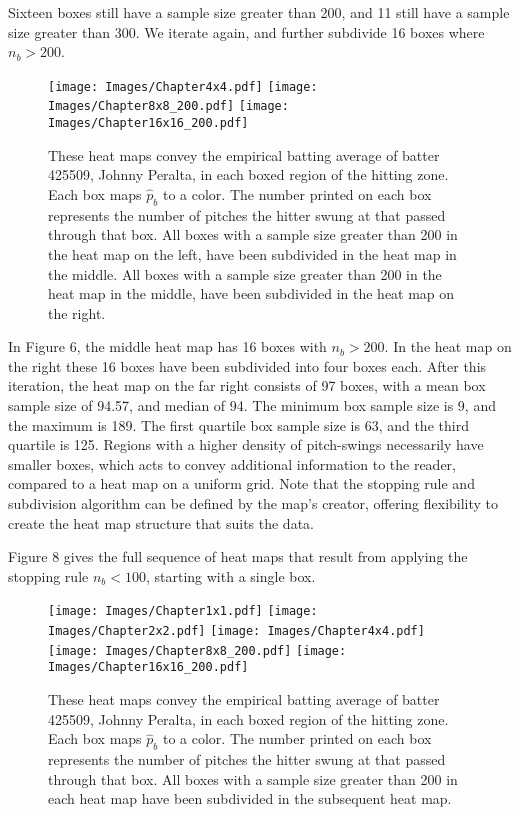 Sixteen boxes still have a sample size greater than 200, and 11 still have a sample size greater than 300. We iterate again, and further subdivide 16 boxes where $n_{b} > 200$.
        \begin{figure}[H]
      	\centering
      	
      	\texttt{[image: Images/Chapter4x4.pdf]}
      	\texttt{[image: Images/Chapter8x8\_200.pdf]} 
      	\texttt{[image: Images/Chapter16x16\_200.pdf]} 
      	\caption{These heat maps convey the empirical batting average of batter 425509, Johnny Peralta, in each boxed region of the hitting zone. Each box maps $\hat{p}_{b}$ to a color. The number printed on each box represents the number of pitches the hitter swung at that passed through that box. All boxes with a sample size greater than 200 in the heat map on the left, have been subdivided in the heat map in the middle. All boxes with a sample size greater than 200 in the heat map in the middle, have been subdivided in the heat map on the right.}
      	\end{figure}
In Figure 6, the middle heat map has 16 boxes with $n_{b} > 200$. In the heat map on the right these 16 boxes have been subdivided into four boxes each. After this iteration, the heat map on the far right consists of 97 boxes, with a mean box sample size of 94.57, and median of 94. The minimum box sample size is 9, and the maximum is 189. The first quartile box sample size is 63, and the third quartile is 125. Regions with a higher density of pitch-swings necessarily have smaller boxes, which acts to convey additional information to the reader, compared to a heat map on a uniform grid. Note that the stopping rule and subdivision algorithm can be defined by the map's creator, offering flexibility to create the heat map structure that suits the data. 

Figure 8 gives the full sequence of heat maps that result from applying the stopping rule $n_{b} < 100$, starting with a single box.
        \begin{figure}[H]
      	\centering
      	\texttt{[image: Images/Chapter1x1.pdf]}
      	\texttt{[image: Images/Chapter2x2.pdf]}
      	\texttt{[image: Images/Chapter4x4.pdf]}
      	\texttt{[image: Images/Chapter8x8\_200.pdf]} 
      	\texttt{[image: Images/Chapter16x16\_200.pdf]} 
      	\caption{These heat maps convey the empirical batting average of batter 425509, Johnny Peralta, in each boxed region of the hitting zone. Each box maps $\hat{p}_{b}$ to a color. The number printed on each box represents the number of pitches the hitter swung at that passed through that box. All boxes with a sample size greater than 200 in each heat map have been subdivided in the subsequent heat map.}
      	\end{figure}


